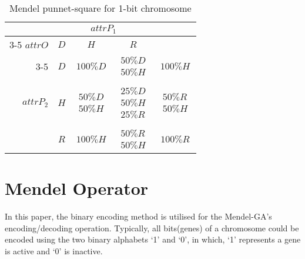 \begin{table}[h!]
  \centering
  \caption{Mendel punnet-square for 1-bit chromosome}
    \begin{tabular}{r|c|ccc}
    \addlinespace
    \toprule
    \multicolumn{2}{c}{} & \multicolumn{3}{c}{$attrP_1$}  \\
     \cmidrule{3-5}
    \multicolumn{2}{c} {{$attrO$}} &{{$D$}} & { {$H$}} & { { $R$}}\\ \cmidrule{3-5}
    { }     & { { $D$}} & $100\% D$ &   $\begin{matrix} 50\% D \\ 50\% H \end{matrix}$     & $100\% H$    \\
    { }     &  \\
    {$attrP_2$} & { { $H$}} & $\begin{matrix} 50\% D \\ 50\% H \end{matrix}$    & $\begin{matrix} 25\% D \\ 50\% H \\ 25\% R  \end{matrix}$    & $\begin{matrix} 50\% R \\ 50\% H \end{matrix}$  \\
    { }     &  \\
    { }     & { { $R$}} & $100\% H$    & $\begin{matrix} 50\% R \\ 50\% H \end{matrix}$    & $100\% R$   \\
       \bottomrule
    \end{tabular}
\label{Mendel_punnet_square}
\end{table}

\section{Mendel Operator }
\label{Mendel_Operator}

In this paper, the binary encoding method is utilised for the Mendel-GA's encoding/decoding operation. Typically, all bits(genes) of a chromosome could be encoded using the two binary alphabets `1' and `0', in which, `1' represents a gene is active and `0' is inactive.

